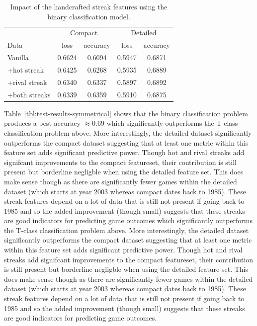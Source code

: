 \documentclass{article} %
\begin{document}
\begin{table}
\centering
  \begin{tabular}{|l|c|c|c|c|}
  \hline
   & \multicolumn{2}{|c|}{Compact} & \multicolumn{2}{|c|}{Detailed}\\
  Data & loss & accuracy & loss & accuracy\\
  \hline
  Vanilla       & 0.6624 & 0.6094 & 0.5947 & 0.6871\\ 
  +hot streak   & 0.6425 & 0.6268 & 0.5935 & 0.6889\\
  +rival streak & 0.6340 & 0.6337 & 0.5897 & 0.6892\\
  +both streaks & 0.6339 & 0.6359 & 0.5910 & 0.6875\\
  \hline
  \end{tabular}
  \caption{Impact of the handcrafted streak features using the binary classification model.}
\end{table}
\label{tbl:test-results-symmetrical}

Table~\ref{tbl:test-results-symmetrical} shows that the binary classification problem produces a best accuracy $\approx 0.69$ which significantly outperforms the T-class classification problem above.
More interestingly, the detailed dataset significantly outperforms the compact dataset suggesting that at least one metric within this feature set adds significant predictive power.
Though hot and rival streaks add signifcant improvements to the compact featureset, their contribution is still present but borderline negligble when using the detailed feature set.
This does make sense though as there are significantly fewer games within the detailed dataset (which starts at year 2003 whereas compact dates back to 1985).
These streak features depend on a lot of data that is still not present if going back to 1985 and so the added improvement (though small) suggests that these streaks are good indicators for predicting game outcomes which significantly outperforms the T-class classification problem above.
More interestingly, the detailed dataset significantly outperforms the compact dataset suggesting that at least one metric within this feature set adds significant predictive power.
Though hot and rival streaks add signifcant improvements to the compact featureset, their contribution is still present but borderline negligble when using the detailed feature set.
This does make sense though as there are significantly fewer games within the detailed dataset (which starts at year 2003 whereas compact dates back to 1985).
These streak features depend on a lot of data that is still not present if going back to 1985 and so the added improvement (though small) suggests that these streaks are good indicators for predicting game outcomes.
\end{document}

